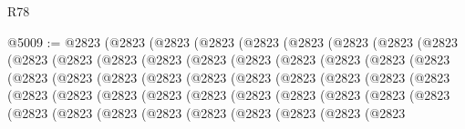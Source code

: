 \begin{lexlean}{R78}
\begin{coremodule}
@5009 := @2823
    (@2823
      (@2823
        (@2823
          (@2823
            (@2823
              (@2823
                (@2823
                  (@2823
                    (@2823
                      (@2823
                        (@2823
                          (@2823
                            (@2823
                              (@2823
                                (@2823
                                  (@2823
                                    (@2823
                                      (@2823
                                        (@2823
                                          (@2823
                                            (@2823
                                              (@2823
                                                (@2823
                                                  (@2823
                                                    (@2823
                                                      (@2823
                                                        (@2823
                                                          (@2823
                                                            (@2823
                                                              (@2823
                                                                (@2823
                                                                  (@2823
                                                                    (@2823
                                                                      (@2823
                                                                        (@2823
                                                                          (@2823
                                                                            (@2823
                                                                              (@2823
                                                                                (@2823
                                                                                  (@2823
                                                                                    (@2823
                                                                                      (@2823
                                                                                        (@2823
                                                                                          (@2823
                                                                                            (@2823
                                                                                              (@2823
                                                                                                (@2823

\end{coremodule}
\end{lexlean}
